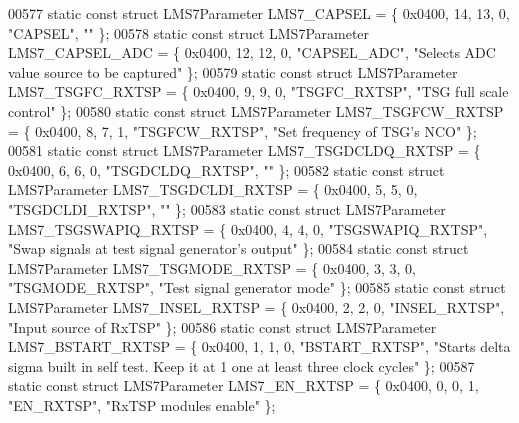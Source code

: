 \begin{DoxyCode}
00577 \textcolor{keyword}{static} \textcolor{keyword}{const} \textcolor{keyword}{struct }LMS7Parameter LMS7_CAPSEL = \{ 0x0400, 14, 13, 0, \textcolor{stringliteral}{"CAPSEL"}, \textcolor{stringliteral}{""} \};
00578 \textcolor{keyword}{static} \textcolor{keyword}{const} \textcolor{keyword}{struct }LMS7Parameter LMS7_CAPSEL_ADC = \{ 0x0400, 12, 12, 0, \textcolor{stringliteral}{"CAPSEL\_ADC"}, \textcolor{stringliteral}{"Selects ADC value
       source to be captured"} \};
00579 \textcolor{keyword}{static} \textcolor{keyword}{const} \textcolor{keyword}{struct }LMS7Parameter LMS7_TSGFC_RXTSP = \{ 0x0400, 9, 9, 0, \textcolor{stringliteral}{"TSGFC\_RXTSP"}, \textcolor{stringliteral}{"TSG full scale
       control"} \};
00580 \textcolor{keyword}{static} \textcolor{keyword}{const} \textcolor{keyword}{struct }LMS7Parameter LMS7_TSGFCW_RXTSP = \{ 0x0400, 8, 7, 1, \textcolor{stringliteral}{"TSGFCW\_RXTSP"}, \textcolor{stringliteral}{"Set frequency of
       TSG's NCO"} \};
00581 \textcolor{keyword}{static} \textcolor{keyword}{const} \textcolor{keyword}{struct }LMS7Parameter LMS7_TSGDCLDQ_RXTSP = \{ 0x0400, 6, 6, 0, \textcolor{stringliteral}{"TSGDCLDQ\_RXTSP"}, \textcolor{stringliteral}{""} \};
00582 \textcolor{keyword}{static} \textcolor{keyword}{const} \textcolor{keyword}{struct }LMS7Parameter LMS7_TSGDCLDI_RXTSP = \{ 0x0400, 5, 5, 0, \textcolor{stringliteral}{"TSGDCLDI\_RXTSP"}, \textcolor{stringliteral}{""} \};
00583 \textcolor{keyword}{static} \textcolor{keyword}{const} \textcolor{keyword}{struct }LMS7Parameter LMS7_TSGSWAPIQ_RXTSP = \{ 0x0400, 4, 4, 0, \textcolor{stringliteral}{"TSGSWAPIQ\_RXTSP"}, \textcolor{stringliteral}{"Swap
       signals at test signal generator's output"} \};
00584 \textcolor{keyword}{static} \textcolor{keyword}{const} \textcolor{keyword}{struct }LMS7Parameter LMS7_TSGMODE_RXTSP = \{ 0x0400, 3, 3, 0, \textcolor{stringliteral}{"TSGMODE\_RXTSP"}, \textcolor{stringliteral}{"Test signal
       generator mode"} \};
00585 \textcolor{keyword}{static} \textcolor{keyword}{const} \textcolor{keyword}{struct }LMS7Parameter LMS7_INSEL_RXTSP = \{ 0x0400, 2, 2, 0, \textcolor{stringliteral}{"INSEL\_RXTSP"}, \textcolor{stringliteral}{"Input source of
       RxTSP"} \};
00586 \textcolor{keyword}{static} \textcolor{keyword}{const} \textcolor{keyword}{struct }LMS7Parameter LMS7_BSTART_RXTSP = \{ 0x0400, 1, 1, 0, \textcolor{stringliteral}{"BSTART\_RXTSP"}, \textcolor{stringliteral}{"Starts delta
       sigma built in self test. Keep it at 1 one at least three clock cycles"} \};
00587 \textcolor{keyword}{static} \textcolor{keyword}{const} \textcolor{keyword}{struct }LMS7Parameter LMS7_EN_RXTSP = \{ 0x0400, 0, 0, 1, \textcolor{stringliteral}{"EN\_RXTSP"}, \textcolor{stringliteral}{"RxTSP modules enable"} \};

\end{DoxyCode}
